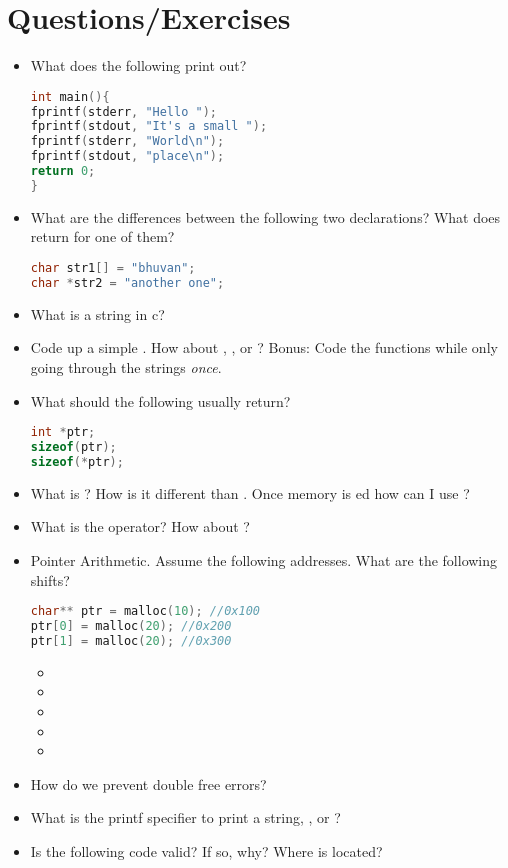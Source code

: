 \section{Questions/Exercises}

\begin{itemize}
\item
  What does the following print out?

\begin{lstlisting}[language=C]
int main(){
fprintf(stderr, "Hello ");
fprintf(stdout, "It's a small ");
fprintf(stderr, "World\n");
fprintf(stdout, "place\n");
return 0;
}
\end{lstlisting}
\item
  What are the differences between the following two declarations? What
  does  return for one of them?

\begin{lstlisting}[language=C]
char str1[] = "bhuvan";
char *str2 = "another one";
\end{lstlisting}
\item
  What is a string in c?
\item
  Code up a simple . How about , , or ? Bonus: Code the functions while only going through the strings \emph{once}.
\item
  What should the following usually return?

\begin{lstlisting}[language=C]
int *ptr;
sizeof(ptr);
sizeof(*ptr);
\end{lstlisting}
\item
  What is ? How is it different than . Once memory is ed how can I use ?
\item
  What is the \keyword{\&} operator? How about \keyword{*}?
\item
  Pointer Arithmetic. Assume the following addresses. What are the following shifts?

\begin{lstlisting}[language=C]
char** ptr = malloc(10); //0x100
ptr[0] = malloc(20); //0x200
ptr[1] = malloc(20); //0x300
\end{lstlisting}

  \begin{itemize}
  \tightlist
  \item
  \item
  \item
  \item
  \item
  \end{itemize}
\item
  How do we prevent double free errors?
\item
  What is the printf specifier to print a string, , or
  ?
\item
  Is the following code valid? If so, why? Where is 
  located?


\end{itemize}
